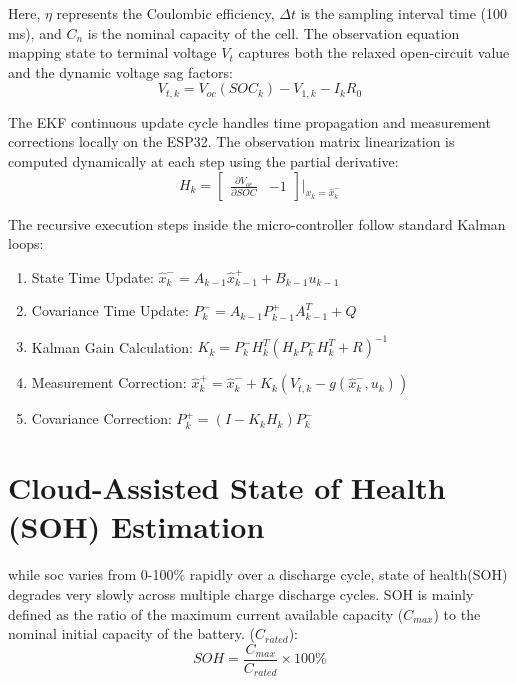 \documentclass[conference]{IEEEtran}
\begin{document}
Here, $\eta$ represents the Coulombic efficiency, $\Delta t$ is the sampling interval time (100 ms), and $C_n$ is the nominal capacity of the cell. The observation equation mapping state to terminal voltage $V_t$ captures both the relaxed open-circuit value and the dynamic voltage sag factors:
\begin{equation}
V_{t,k} = V_{oc}(SOC_k) - V_{1,k} - I_k R_0
\end{equation}

The EKF continuous update cycle handles time propagation and measurement corrections locally on the ESP32. The observation matrix linearization is computed dynamically at each step using the partial derivative:
\begin{equation}
H_k = \begin{bmatrix} \frac{\partial V_{oc}}{\partial SOC} & -1 \end{bmatrix}\bigg|_{x_k = \hat{x}_k^-}
\end{equation}

The recursive execution steps inside the micro-controller follow standard Kalman loops:
\begin{enumerate}
    \item State Time Update: $\hat{x}_k^- = A_{k-1}\hat{x}_{k-1}^+ + B_{k-1}u_{k-1}$
    \item Covariance Time Update: $P_k^- = A_{k-1}P_{k-1}^+A_{k-1}^T + Q$
    \item Kalman Gain Calculation: $K_k = P_k^-H_k^T(H_kP_k^-H_k^T + R)^{-1}$
    \item Measurement Correction: $\hat{x}_k^+ = \hat{x}_k^- + K_k(V_{t,k} - g(\hat{x}_k^-, u_k))$
    \item Covariance Correction: $P_k^+ = (I - K_kH_k)P_k^-$
\end{enumerate}

\section{Cloud-Assisted State of Health (SOH) Estimation}
while soc varies from 0-100\% rapidly over a discharge cycle, state of health(SOH) degrades very slowly across multiple charge discharge cycles. SOH is mainly defined as the ratio of the maximum current available capacity ($C_{max}$) to the nominal initial capacity of the battery. ($C_{rated}$):
\begin{equation}
SOH = \frac{C_{max}}{C_{rated}} \times 100\%
\end{equation}
\end{document}
